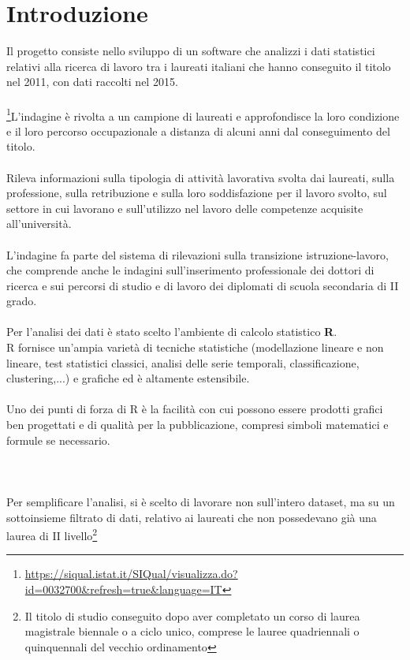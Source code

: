\documentclass[14pt, openany, titlepage]{report} %
\begin{document}
\chapter{Introduzione}
Il progetto consiste nello sviluppo di un software che analizzi i dati statistici relativi alla ricerca di lavoro tra i laureati italiani che hanno conseguito il titolo nel 2011, con dati raccolti nel 2015. \\\\
\footnote{\url{https://siqual.istat.it/SIQual/visualizza.do?id=0032700&refresh=true&language=IT}}L’indagine è rivolta a un campione di laureati e approfondisce la loro condizione e il loro percorso occupazionale a distanza di alcuni anni dal conseguimento del titolo. \\\\
Rileva informazioni sulla tipologia di attività lavorativa svolta dai laureati, sulla professione, sulla retribuzione e sulla loro soddisfazione per il lavoro svolto, sul settore in cui lavorano e sull'utilizzo nel lavoro delle competenze acquisite all'università.\\\\
L’indagine fa parte del sistema di rilevazioni sulla transizione istruzione-lavoro, che comprende anche le indagini sull'inserimento professionale dei dottori di ricerca e sui percorsi di studio e di lavoro dei diplomati di scuola secondaria di II grado.\\\\
\noindent
Per l'analisi dei dati è stato scelto l'ambiente di calcolo statistico \textbf{R}. \\
R fornisce un'ampia varietà di tecniche statistiche (modellazione lineare e non lineare, test statistici classici, analisi delle serie temporali, classificazione, clustering,...)
e grafiche ed è altamente estensibile.\\\\
\noindent
Uno dei punti di forza di R è la facilità con cui possono essere prodotti grafici ben progettati e di qualità per la pubblicazione, 
compresi simboli matematici e formule se necessario.\\\\\\\\
\noindent
Per semplificare l'analisi, si è scelto di lavorare non sull'intero dataset, 
ma su un sottoinsieme filtrato di dati, relativo ai laureati che non possedevano 
già una laurea di II livello\footnote{Il titolo di studio conseguito dopo aver completato un corso di 
laurea magistrale biennale o a ciclo unico, comprese le lauree quadriennali o quinquennali del vecchio ordinamento} 
\end{document}
